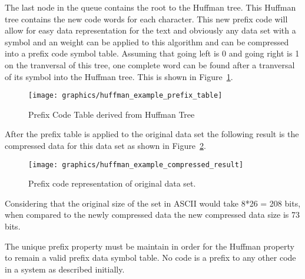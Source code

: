 \documentclass[letterpaper, 12pt]{article}
\begin{document}
The last node in the queue contains the root to the Huffman tree. This Huffman tree
contains the new code words for each character. This new prefix code will allow for easy
data representation for the text and obviously any data set with a symbol and an weight can
be applied to this algorithm and can be compressed into a prefix code symbol table.
Assuming that going left is 0 and going right is 1 on the tranversal of this tree, one complete
word can be found after a tranversal of its symbol into the Huffman tree. This is shown in
Figure~\ref{fig:huffman_prefix_table}.
\par\vspace{\baselineskip}

\begin{figure}
  \centering
  \texttt{[image: graphics/huffman\_example\_prefix\_table]}
  \cite{huffman}
  \caption{Prefix Code Table derived from Huffman Tree}
  \label{fig:huffman_prefix_table}
\end{figure}

\par\vspace{\baselineskip}
After the prefix table is applied to the original data set the following result is the compressed
data for this data set as shown in Figure~\ref{fig:huffman_compressed}.
\par\vspace{\baselineskip}
\begin{figure}
  \centering
  \texttt{[image: graphics/huffman\_example\_compressed\_result]}
  \cite{huffman}
  \caption{Prefix code representation of original data set.}
  \label{fig:huffman_compressed}
\end{figure}

Considering that the original size of the set in ASCII would take 8*26 = 208 bits, when compared to
the newly compressed data the new compressed data size is 73 bits.
\par\vspace{\baselineskip}
The unique prefix property must be maintain in order for the Huffman property to remain a valid prefix
data symbol table. No code is a prefix to any other code in a system as described initially.
\par\vspace{\baselineskip}
\end{document}
